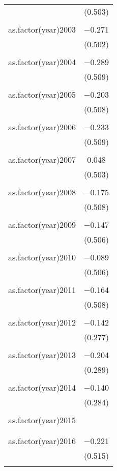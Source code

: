 \documentclass[12pt,letterpaper]{article}
\begin{document}
\begin{table}[!htbp]
{\begin{tabular}{@{\extracolsep{5pt}}lc}
		& (0.503) \\ 
		& \\ 
		as.factor(year)2003 & $-$0.271 \\ 
		& (0.502) \\ 
		& \\ 
		as.factor(year)2004 & $-$0.289 \\ 
		& (0.509) \\ 
		& \\ 
		as.factor(year)2005 & $-$0.203 \\ 
		& (0.508) \\ 
		& \\ 
		as.factor(year)2006 & $-$0.233 \\ 
		& (0.509) \\ 
		& \\ 
		as.factor(year)2007 & 0.048 \\ 
		& (0.503) \\ 
		& \\ 
		as.factor(year)2008 & $-$0.175 \\ 
		& (0.508) \\ 
		& \\ 
		as.factor(year)2009 & $-$0.147 \\ 
		& (0.506) \\ 
		& \\ 
		as.factor(year)2010 & $-$0.089 \\ 
		& (0.506) \\ 
		& \\ 
		as.factor(year)2011 & $-$0.164 \\ 
		& (0.508) \\ 
		& \\ 
		as.factor(year)2012 & $-$0.142 \\ 
		& (0.277) \\ 
		& \\ 
		as.factor(year)2013 & $-$0.204 \\ 
		& (0.289) \\ 
		& \\ 
		as.factor(year)2014 & $-$0.140 \\ 
		& (0.284) \\ 
		& \\ 
		as.factor(year)2015 &  \\ 
		&  \\ 
		& \\ 
		as.factor(year)2016 & $-$0.221 \\ 
		& (0.515) \\ 
		& \\ 

\end{tabular}}
\end{table}
\end{document}
